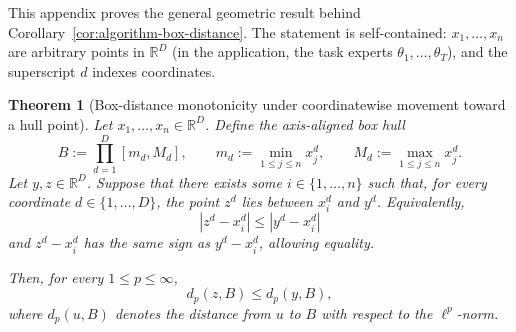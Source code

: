 \documentclass{article} %
\newtheorem{theorem}{Theorem}
\begin{document}
This appendix proves the general geometric result behind
Corollary~\ref{cor:algorithm-box-distance}. The statement is
self-contained: $x_1,\dots,x_n$ are arbitrary points in $\mathbb{R}^D$
(in the application, the task experts $\theta_1,\dots,\theta_T$), and the
superscript $d$ indexes coordinates.

\begin{theorem}[Box-distance monotonicity under coordinatewise movement toward a hull point]
\label{thm:box-distance-monotonicity}
Let \(x_1,\dots,x_n\in \mathbb{R}^D\). Define the axis-aligned box hull
\[
B:=\prod_{d=1}^D [m_d,M_d],
\qquad
m_d:=\min_{1\le j\le n} x_j^d,
\qquad
M_d:=\max_{1\le j\le n} x_j^d.
\]
Let \(y,z\in \mathbb{R}^D\). Suppose that there exists some
\(i\in\{1,\dots,n\}\) such that, for every coordinate \(d\in\{1,\dots,D\}\),
the point \(z^d\) lies between \(x_i^d\) and \(y^d\). Equivalently,
\[
|z^d-x_i^d|\le |y^d-x_i^d|
\]
and \(z^d-x_i^d\) has the same sign as \(y^d-x_i^d\), allowing equality.

Then, for every \(1\le p\le \infty\),
\[
d_p(z,B)\le d_p(y,B),
\]
where \(d_p(u,B)\) denotes the distance from \(u\) to \(B\) with respect to
the \(\ell^p\)-norm.
\end{theorem}
\end{document}
